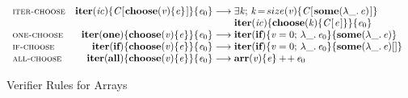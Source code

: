 
\begin{figure}[t]
$\begin{array}{@{}l}
\begin{array}{@{\hskip0.5em} l r @{\;}c@{\;} l l@{}}
  \rulename{iter-choose}   & \ensuremath{\textbf{iter}(\Varid{ic})\{\Conid{C} [\mskip1.5mu \textbf{choose}(\Varid{v})\{\Varid{e}\}\mskip1.5mu]\}\{\Varid{e}_{\mathrm{0}}\}}
  & \movesto & \begin{array}[t]{@{}l}
    \ensuremath{\exists\Varid{k};\,\Varid{k}\hspace{-0.14em}=\hspace{-0.14em}size(\Varid{v})\{\Conid{C} [\mskip1.5mu {\bf some}(\lambda \_.\,\Varid{e})\mskip1.5mu]\}} \\
    \ensuremath{\textbf{iter}(\Varid{ic})\{\textbf{choose}(\Varid{k})\{\Conid{C} [\mskip1.5mu \Varid{e}\mskip1.5mu]\}\}\{\Varid{e}_{\mathrm{0}}\}}
    \end{array} \\

\rulename{one-choose} & \ensuremath{\textbf{iter}(\textbf{one})\{\textbf{choose}(\Varid{v})\{\Varid{e}\}\}\{\Varid{e}_{\mathrm{0}}\}}
  & \movesto & \ensuremath{\textbf{iter}(\textbf{if})\{\Varid{v}\mathrel{=}\mathrm{0};\,\lambda \_.\,\Varid{e}_{\mathrm{0}}\}\{{\bf some}(\lambda \_.\,\Varid{e})\}} \\

\rulename{if-choose} & \ensuremath{\textbf{iter}(\textbf{if})\{\textbf{choose}(\Varid{v})\{\Varid{e}\}\}\{\Varid{e}_{\mathrm{0}}\}}
  & \movesto & \ensuremath{\textbf{iter}(\textbf{if})\{\Varid{v}\mathrel{=}\mathrm{0};\,\lambda \_.\,\Varid{e}_{\mathrm{0}}\}\{{\bf some}(\lambda \_.\,\Varid{e})[]\}} \\

\rulename{all-choose} & \ensuremath{\textbf{iter}(\textbf{all})\{\textbf{choose}(\Varid{v})\{\Varid{e}\}\}\{\Varid{e}_{\mathrm{0}}\}}
  & \movesto & \ensuremath{\textbf{arr}(\Varid{v})\{\Varid{e}\}+ \! + \,\Varid{e}_{\mathrm{0}}} \\

\end{array}
\end{array}$
\\[0.1in]
\caption{Verifier Rules for Arrays}
\label{fig:verifier-rules-arrays}
\end{figure}




